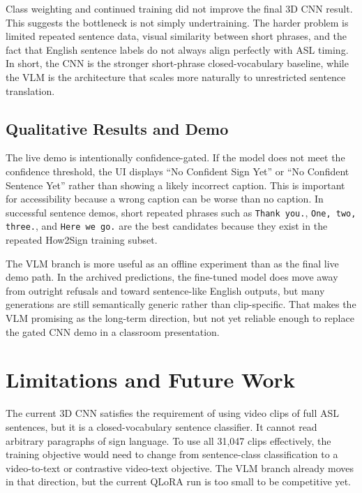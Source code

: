 \documentclass[10pt,twocolumn,letterpaper]{article}
\begin{document}
Class weighting and continued training did not improve the final 3D CNN result. This suggests the bottleneck is not simply undertraining. The harder problem is limited repeated sentence data, visual similarity between short phrases, and the fact that English sentence labels do not always align perfectly with ASL timing. In short, the CNN is the stronger short-phrase closed-vocabulary baseline, while the VLM is the architecture that scales more naturally to unrestricted sentence translation.

\subsection{Qualitative Results and Demo}

The live demo is intentionally confidence-gated. If the model does not meet the confidence threshold, the UI displays ``No Confident Sign Yet'' or ``No Confident Sentence Yet'' rather than showing a likely incorrect caption. This is important for accessibility because a wrong caption can be worse than no caption. In successful sentence demos, short repeated phrases such as \texttt{Thank you.}, \texttt{One, two, three.}, and \texttt{Here we go.} are the best candidates because they exist in the repeated How2Sign training subset.

The VLM branch is more useful as an offline experiment than as the final live demo path. In the archived predictions, the fine-tuned model does move away from outright refusals and toward sentence-like English outputs, but many generations are still semantically generic rather than clip-specific. That makes the VLM promising as the long-term direction, but not yet reliable enough to replace the gated CNN demo in a classroom presentation.

\section{Limitations and Future Work}

The current 3D CNN satisfies the requirement of using video clips of full ASL sentences, but it is a closed-vocabulary sentence classifier. It cannot read arbitrary paragraphs of sign language. To use all 31,047 clips effectively, the training objective would need to change from sentence-class classification to a video-to-text or contrastive video-text objective. The VLM branch already moves in that direction, but the current QLoRA run is too small to be competitive yet.
\end{document}
